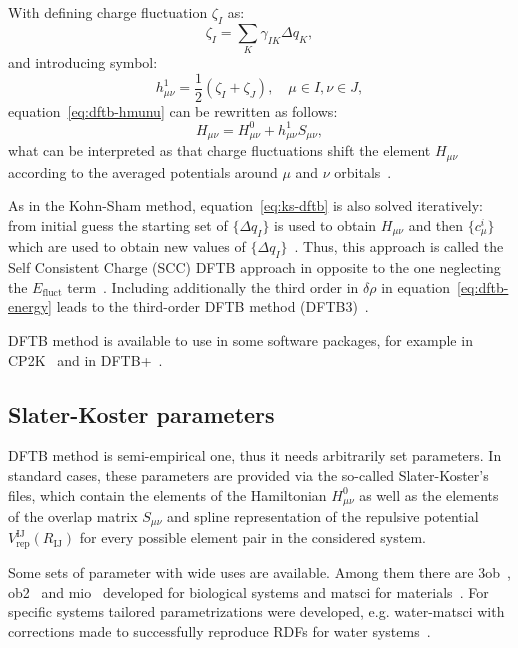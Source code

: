 With defining charge fluctuation $\zeta_I$ as:
\begin{equation}
    \zeta_I = \sum_K \gamma_{IK} \Delta q_K,
\end{equation}
and introducing symbol:
\begin{equation}
    h^{1}_{\mu \nu} = \frac{1}{2} \left( \zeta_I + \zeta_J \right), \quad \mu \in I, \nu \in J,
\end{equation}
equation~\ref{eq:dftb-hmunu} can be rewritten as follows:
\begin{equation}
    H_{\mu \nu} = H^{0}_{\mu \nu} + h^{1}_{\mu \nu} S_{\mu \nu},
\end{equation}
what can be interpreted as that charge fluctuations shift the element $H_{\mu \nu}$ according to the averaged potentials around $\mu$ and $\nu$ orbitals~\cite{dftb-for-beginners}.

As in the Kohn-Sham method, equation~\ref{eq:ks-dftb} is also solved iteratively: from initial guess the starting set of $\{ \Delta q_I \}$ is used to obtain $H_{\mu \nu}$ and then $\{ c^{i}_{\mu} \}$ which are used to obtain new values of $\{ \Delta q_I \}$~\cite{dftb-1,dftb-3}. Thus, this approach is called the Self Consistent Charge (SCC) DFTB approach in opposite to the one neglecting the $E_{\text{fluct}}$ term~\cite{dftb-2}. Including additionally the third order in $\delta \rho$ in equation~\ref{eq:dftb-energy} leads to the third-order DFTB method (DFTB3)~\cite{dftb-third-order}.

DFTB method is available to use in some software packages, for example in CP2K~\cite{cp2k} and in DFTB+~\cite{dftb-plus}.

\subsection{Slater-Koster parameters}

DFTB method is semi-empirical one, thus it needs arbitrarily set parameters. In standard cases, these parameters are provided via the so-called Slater-Koster's files, which contain the elements of the Hamiltonian $H_{\mu \nu}^{0}$ as well as the elements of the overlap matrix $S_{\mu \nu}$ and spline representation of the repulsive potential $V_{\text{rep}}^{\text{IJ}}(R_{\text{IJ}})$ for every possible element pair in the considered system.

Some sets of parameter with wide uses are available. Among them there are 3ob~\cite{3ob-1,3ob-2,3ob-3,3ob-4}, ob2~\cite{ob2} and mio~\cite{mio} developed for biological systems and matsci for materials~\cite{matsci}. For specific systems tailored parametrizations were developed, e.g. water-matsci with corrections made to successfully reproduce RDFs for water systems~\cite{water-matsci}.

